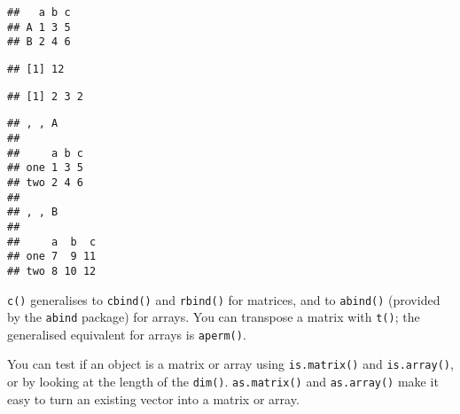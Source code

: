 \begin{verbatim}
##   a b c
## A 1 3 5
## B 2 4 6
\end{verbatim}

\begin{Shaded}
\begin{Highlighting}[]
\end{Highlighting}
\end{Shaded}

\begin{verbatim}
## [1] 12
\end{verbatim}

\begin{Shaded}
\begin{Highlighting}[]
\end{Highlighting}
\end{Shaded}

\begin{verbatim}
## [1] 2 3 2
\end{verbatim}

\begin{Shaded}
\begin{Highlighting}[]
\StringTok{ }\NormalTok{(}\NormalTok{(}\NormalTok{, }\NormalTok{), }\NormalTok{(}\NormalTok{, }\NormalTok{, }\NormalTok{), }\NormalTok{(}\NormalTok{, }\NormalTok{))}
\end{Highlighting}
\end{Shaded}

\begin{verbatim}
## , , A
## 
##     a b c
## one 1 3 5
## two 2 4 6
## 
## , , B
## 
##     a  b  c
## one 7  9 11
## two 8 10 12
\end{verbatim}

\texttt{c()} generalises to \texttt{cbind()} and \texttt{rbind()} for
matrices, and to \texttt{abind()} (provided by the \texttt{abind}
package) for arrays. You can transpose a matrix with \texttt{t()}; the
generalised equivalent for arrays is \texttt{aperm()}. 
  

You can test if an object is a matrix or array using
\texttt{is.matrix()} and \texttt{is.array()}, or by looking at the
length of the \texttt{dim()}. \texttt{as.matrix()} and
\texttt{as.array()} make it easy to turn an existing vector into a
matrix or array.


